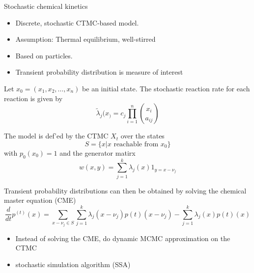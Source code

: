 \documentclass[rgb]{beamer}
\begin{document}
    \begin{frame}[allowframebreaks]{Stochastic chemical kinetics}
    \begin{itemize}
        \item Discrete, stochastic CTMC-based model.
        \item Assumption: Thermal equilibrium, well-stirred
        \item Based on particles.
        \item Transient probability distribution is measure of interest
    \end{itemize}
    \vfill
    Let $x_0 = (x_1, x_2, \dots, x_n)$ be an initial state. The stochastic reaction rate for each reaction is given by 
        \[ \tilde\lambda_j (x_) = c_j \prod_{i=1}^n \binom{x_i}{a_{ij}} \]
        
    \framebreak
        
    The model is def'ed by the CTMC ${X_t}$ over the states $$S = \{x | x \text{ reachable from } x_0 \}$$ with $p_0(x_0) = 1$ and the generator matirx
        \[ w(x,y) = \sum_{j = 1}^k \lambda_j(x) 1_{y = x - \nu_j}  \]

        
    Transient probability distributions can then be obtained by solving the chemical master equation (CME)
    \[ \frac{d}{dt} p^{(t)} (x) = \sum_{x-\nu_j \in S} \sum_{j = 1}^{k} \lambda_j (x - \nu_{j}) p{(t)}(x - \nu_{j}) - \sum_{j = 1}^k \lambda_j (x) p{(t)}(x) \]
    
    \begin{itemize}
     \item Instead of solving the CME, do dynamic MCMC approximation on the CTMC
     \item stochastic simulation algorithm (SSA)
    \end{itemize}
    \end{frame}
    
\end{document}
